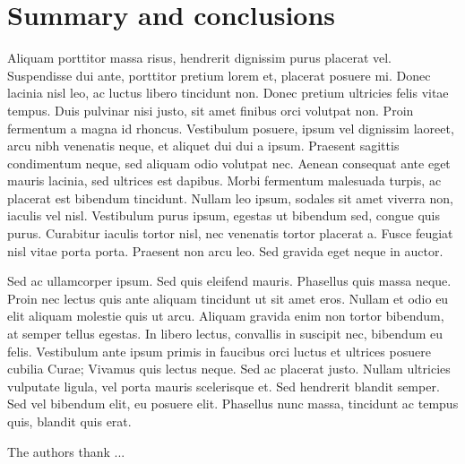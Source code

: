 \documentclass[aps,prc,reprint,amsmath,nofootinbib]{revtex4-1}
\begin{document}
\section{Summary and conclusions}

Aliquam porttitor massa risus, hendrerit dignissim purus placerat vel. Suspendisse dui ante, porttitor pretium lorem et, placerat posuere mi. Donec lacinia nisl leo, ac luctus libero tincidunt non. Donec pretium ultricies felis vitae tempus. Duis pulvinar nisi justo, sit amet finibus orci volutpat non. Proin fermentum a magna id rhoncus. Vestibulum posuere, ipsum vel dignissim laoreet, arcu nibh venenatis neque, et aliquet dui dui a ipsum. Praesent sagittis condimentum neque, sed aliquam odio volutpat nec. Aenean consequat ante eget mauris lacinia, sed ultrices est dapibus. Morbi fermentum malesuada turpis, ac placerat est bibendum tincidunt. Nullam leo ipsum, sodales sit amet viverra non, iaculis vel nisl. Vestibulum purus ipsum, egestas ut bibendum sed, congue quis purus. Curabitur iaculis tortor nisl, nec venenatis tortor placerat a. Fusce feugiat nisl vitae porta porta. Praesent non arcu leo. Sed gravida eget neque in auctor.

Sed ac ullamcorper ipsum. Sed quis eleifend mauris. Phasellus quis massa neque. Proin nec lectus quis ante aliquam tincidunt ut sit amet eros. Nullam et odio eu elit aliquam molestie quis ut arcu. Aliquam gravida enim non tortor bibendum, at semper tellus egestas. In libero lectus, convallis in suscipit nec, bibendum eu felis. Vestibulum ante ipsum primis in faucibus orci luctus et ultrices posuere cubilia Curae; Vivamus quis lectus neque. Sed ac placerat justo. Nullam ultricies vulputate ligula, vel porta mauris scelerisque et. Sed hendrerit blandit semper. Sed vel bibendum elit, eu posuere elit. Phasellus nunc massa, tincidunt ac tempus quis, blandit quis erat. 

\begin{acknowledgments}
  The authors thank ...
\end{acknowledgments}


\end{document}
